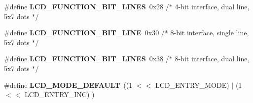 \begin{DoxyCompactItemize}
\item 
\#define {\bfseries L\+C\+D\+\_\+\+F\+U\+N\+C\+T\+I\+O\+N\+\_\+B\+I\+T\+\_\+L\+I\+N\+ES}~0x28 /$\ast$ 4-\/bit interface, dual line,   5x7 dots $\ast$/\hypertarget{a00006_gab35032ab368a8bc90798e0c547fb24c2}{}\label{a00006_gab35032ab368a8bc90798e0c547fb24c2}

\item 
\#define {\bfseries L\+C\+D\+\_\+\+F\+U\+N\+C\+T\+I\+O\+N\+\_\+B\+I\+T\+\_\+L\+I\+NE}~0x30 /$\ast$ 8-\/bit interface, single line, 5x7 dots $\ast$/\hypertarget{a00006_gaa8aeee098cb4c84ec420e00d054abcce}{}\label{a00006_gaa8aeee098cb4c84ec420e00d054abcce}

\item 
\#define {\bfseries L\+C\+D\+\_\+\+F\+U\+N\+C\+T\+I\+O\+N\+\_\+B\+I\+T\+\_\+L\+I\+N\+ES}~0x38 /$\ast$ 8-\/bit interface, dual line,   5x7 dots $\ast$/\hypertarget{a00006_ga160a214f47869f8f98ad5add3a7568db}{}\label{a00006_ga160a214f47869f8f98ad5add3a7568db}

\item 
\#define {\bfseries L\+C\+D\+\_\+\+M\+O\+D\+E\+\_\+\+D\+E\+F\+A\+U\+LT}~((1 $<$$<$ L\+C\+D\+\_\+\+E\+N\+T\+R\+Y\+\_\+\+M\+O\+DE) $\vert$ (1 $<$$<$ L\+C\+D\+\_\+\+E\+N\+T\+R\+Y\+\_\+\+I\+NC) )\hypertarget{a00006_ga1849e2087d3034a3fffa67444beed109}{}\label{a00006_ga1849e2087d3034a3fffa67444beed109}

\end{DoxyCompactItemize}
